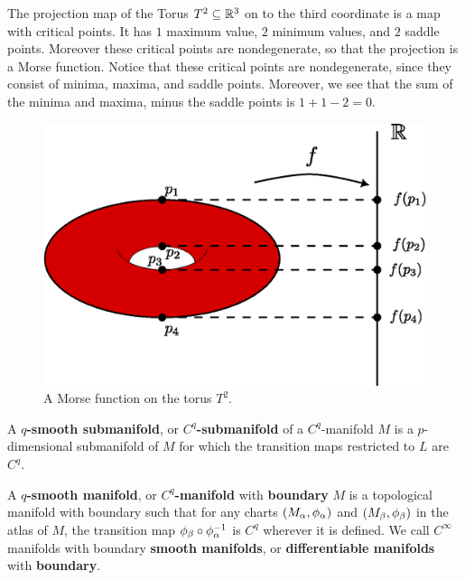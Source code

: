 \begin{example}\label{1.8}
    The projection map of the Torus $T^2 \subseteq \mathbb{R}^3$ on to the third
    coordinate is a map with critical points. It has $1$ maximum value,  $2$
    minimum values, and  $2$ saddle points. Moreover these critical points are
    nondegenerate, so that the projection is a Morse function. Notice that these
    critical points are nondegenerate, since they consist of minima, maxima, and
    saddle points. Moreover, we see that the sum of the minima and maxima, minus
    the saddle points is $1+1-2=0$.
    \begin{figure}[h]
        \centering
        \includegraphics[scale=0.5]{Figures/Chapter1/morse_func_torus.eps}
        \caption{A Morse function on the torus $T^2$.}
        \label{figure_1.5}
    \end{figure}
\end{example}

\begin{definition}
    A \textbf{$q$-smooth submanifold}, or  \textbf{$C^q$-submanifold} of a
     $C^q$-manifold  $M$ is a  $p$-dimensional submanifold of $M$ for which the
     transition maps restricted to $L$ are  $C^q$.
\end{definition}

\begin{definition}
    A  \textbf{$q$-smooth manifold}, or \textbf{$C^q$-manifold} with
    \textbf{boundary} $M$ is a topological manifold with boundary such that for any
    charts $(M_\alpha,\phi_\alpha)$ and $(M_\beta,\phi_\beta)$ in the atlas of $M$, the
    transition map  $\phi_\beta \circ \phi_\alpha^{-1}$ is $C^q$ wherever it is
    defined. We call $C^\infty$ manifolds with boundary  \textbf{smooth
    manifolds}, or \textbf{differentiable manifolds} with \textbf{boundary}.
\end{definition}

